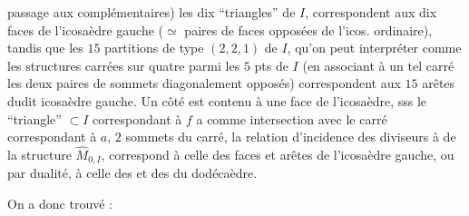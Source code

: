 passage aux complémentaires) les dix ``triangles'' de $I$, correspondent aux dix faces de l'icosaèdre gauche ($\simeq$ paires de faces opposées de l'icos. ordinaire), tandis que les $15$ partitions de type $(2,2,1)$ de $I$, qu'on peut interpréter comme les structures carrées sur quatre parmi les $5$ pts de $I$
(en associant à un tel carré les deux paires de sommets diagonalement opposés) correspondent aux $15$ arêtes dudit icosaèdre gauche.
Un côté  est contenu  à une face  de l'icosaèdre, sss le ``triangle'' $\subset I$ correspondant à $f$ a comme intersection avec le carré correspondant à $a$,   $2$ sommets  du carré, 
 la relation d'incidence des diviseurs à  de la structure $\widehat M_{0,I}$, correspond à celle des faces et arêtes de l'icosaèdre gauche, ou par dualité, à celle des  et des  du dodécaèdre.

On a donc trouvé :
